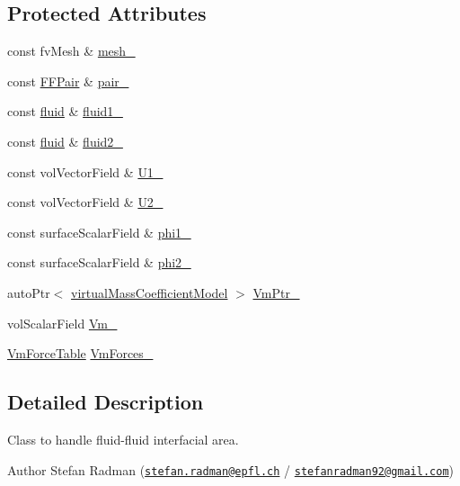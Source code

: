 \subsection*{Protected Attributes}
\begin{DoxyCompactItemize}
\item 
const fv\+Mesh \& \hyperlink{classFoam_1_1virtualMass_a23edeeeecebcef11921a33dd5d990570}{mesh\+\_\+}
\item 
const \hyperlink{classFoam_1_1FFPair}{F\+F\+Pair} \& \hyperlink{classFoam_1_1virtualMass_ad015e769561f394d7c717d4356dcded4}{pair\+\_\+}
\item 
const \hyperlink{classFoam_1_1fluid}{fluid} \& \hyperlink{classFoam_1_1virtualMass_a5e2d96f5c8eaf3d2ba2fd36db82b8e8b}{fluid1\+\_\+}
\item 
const \hyperlink{classFoam_1_1fluid}{fluid} \& \hyperlink{classFoam_1_1virtualMass_a10350fa01c5980453030c19e26a2253f}{fluid2\+\_\+}
\item 
const vol\+Vector\+Field \& \hyperlink{classFoam_1_1virtualMass_ad681053b7f23b343f21cab86b3e6b985}{U1\+\_\+}
\item 
const vol\+Vector\+Field \& \hyperlink{classFoam_1_1virtualMass_a2dff165a03253b0a2753b7bf6ad6b4ef}{U2\+\_\+}
\item 
const surface\+Scalar\+Field \& \hyperlink{classFoam_1_1virtualMass_ae6787bd203715cac19641d1146045e9e}{phi1\+\_\+}
\item 
const surface\+Scalar\+Field \& \hyperlink{classFoam_1_1virtualMass_a4d1f1742babf694fbfdc060f549fd21a}{phi2\+\_\+}
\item 
auto\+Ptr$<$ \hyperlink{classFoam_1_1virtualMassCoefficientModel}{virtual\+Mass\+Coefficient\+Model} $>$ \hyperlink{classFoam_1_1virtualMass_a2b7a8c765d2e8442970a9024ad6dfe30}{Vm\+Ptr\+\_\+}
\item 
vol\+Scalar\+Field \hyperlink{classFoam_1_1virtualMass_a1a89f4eb67a364c1f685848c0bdb33de}{Vm\+\_\+}
\item 
\hyperlink{classFoam_1_1virtualMass_af57d3dff5978a5ef9bc2df99473ebc19}{Vm\+Force\+Table} \hyperlink{classFoam_1_1virtualMass_ad3dbf2d6adad031bf761a4ef33246f79}{Vm\+Forces\+\_\+}
\end{DoxyCompactItemize}


\subsection{Detailed Description}
Class to handle fluid-\/fluid interfacial area. 

\label{_Description}%
 Author Stefan Radman (\href{mailto:stefan.radman@epfl.ch}{\tt stefan.\+radman@epfl.\+ch} / \href{mailto:stefanradman92@gmail.com}{\tt stefanradman92@gmail.\+com})

